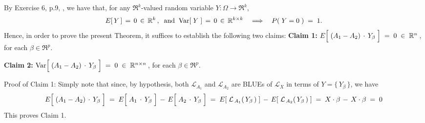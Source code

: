 \proof
By Exercise 6, p.9, \cite{Christensen2011}, we have that, for any $\Re^{k}$-valued
random variable $Y : \Omega \longrightarrow \Re^{k}$,
\begin{equation*}
E\!\left[\,Y\,\right] \,=\, 0 \,\in\, \mathbb{R}^{k}\,,
\;\;\textnormal{and}\;\;
\textnormal{Var}\!\left[\;Y\;\right] \,=\, 0 \,\in\, \mathbb{R}^{k \times k}
\quad\Longrightarrow\quad
P\!\left(\;Y = 0\;\right) \; = \; 1.
\end{equation*}
Hence, in order to prove the present Theorem, it suffices to establish the following two claims:
\vskip 0.3cm
\noindent
\textbf{Claim 1:}\quad
$E\!\left[\;(A_{1} - A_{2}) \overset{{\color{white}-}}{\cdot} Y_{\beta}\;\right] \;=\; 0 \;\in\; \Re^{n}$\,,
for each $\beta \in \Re^{p}$.

\vskip 0.3cm
\noindent
\textbf{Claim 2:}\quad
$\Var\!\left[\;(A_{1} - A_{2}) \overset{{\color{white}-}}{\cdot} Y_{\beta}\;\right] \;=\; 0 \;\in\; \Re^{n \times n}$\,,
for each $\beta \in \Re^{p}$.


\vskip 0.3cm
\noindent
Proof of Claim 1:\quad
Simply note that since, by hypothesis, both
$\mathcal{L}_{A_{1}}$ and $\mathcal{L}_{A_{2}}$ are BLUEs
of $\mathcal{L}_{X}$ in terms of $Y = \{\,Y_{\beta}\,\}$, we have
\begin{equation*}
E\!\left[\;(A_{1} - A_{2}) \overset{{\color{white}-}}{\cdot} Y_{\beta}\;\right]
\; = \;
	E\!\left[\;A_{1} \overset{{\color{white}-}}{\cdot} Y_{\beta}\;\right]
	\, - \,
	E\!\left[\;A_{2} \overset{{\color{white}-}}{\cdot} Y_{\beta}\;\right]
\; = \;
	E\!\left[\;\mathcal{L}_{\,A_{1}}(\,Y_{\beta}\,)\;\right]
	\, - \,
	E\!\left[\;\mathcal{L}_{\,A_{2}}(\,Y_{\beta}\,)\;\right]
\; = \;
	X \cdot \beta
	\, - \,
	X \cdot \beta
\; = \;
	0
\end{equation*}
This proves Claim 1.

